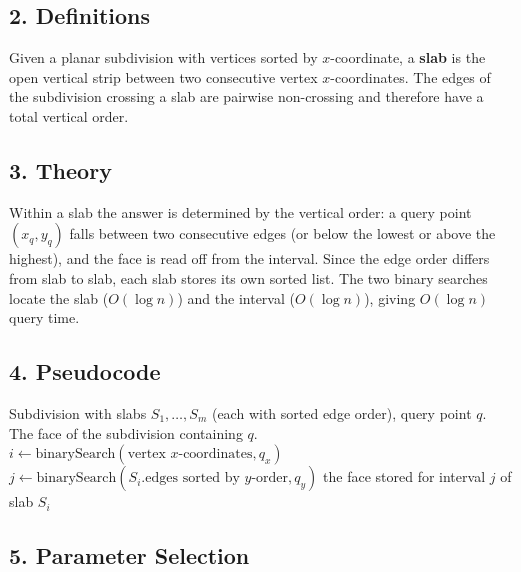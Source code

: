 \subsection{2. Definitions}

\begin{definition}[Slab]\label{def:pointloc_slab}
  Given a planar subdivision with vertices sorted by $x$-coordinate, a
  \textbf{slab} is the open vertical strip between two consecutive vertex
  $x$-coordinates. The edges of the subdivision crossing a slab are
  pairwise non-crossing and therefore have a total vertical order.
\end{definition}

\subsection{3. Theory}

Within a slab the answer is determined by the vertical order: a query point
$(x_q, y_q)$ falls between two consecutive edges (or below the lowest or
above the highest), and the face is read off from the interval. Since the
edge order differs from slab to slab, each slab stores its own sorted list.
The two binary searches locate the slab ($O(\log n)$) and the interval
($O(\log n)$), giving $O(\log n)$ query time.

\subsection{4. Pseudocode}

\begin{algorithm}[htbp]
\caption{Point Location by Slab Decomposition}
\label{alg:pointloc_slabs}
\begin{algorithmic}[1]
\Require Subdivision with slabs $S_1,\dots,S_{m}$ (each with sorted edge order), query point $q$.
\Ensure The face of the subdivision containing $q$.
  \State $i \gets \text{binarySearch}(\text{vertex } x\text{-coordinates}, q_x)$
  \State $j \gets \text{binarySearch}(S_i.\text{edges sorted by } y\text{-order}, q_y)$
  \State \Return the face stored for interval $j$ of slab $S_i$
\EndFunction
\end{algorithmic}
\end{algorithm}

\subsection{5. Parameter Selection}

